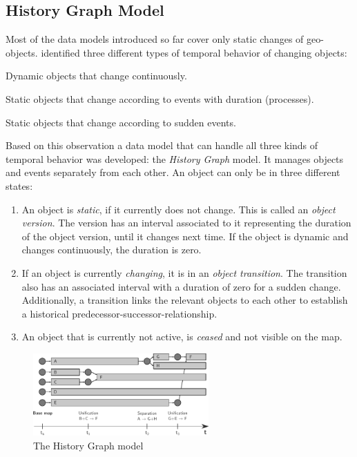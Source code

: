 
\subsection{History Graph Model} %
\label{sub:history_graph_model}

Most of the data models introduced so far cover only static changes of geo-objects. \cite{renolen96} identified three different types of temporal behavior of changing objects:
\begin{compactitem}
  \item Dynamic objects that change continuously.
  \item Static objects that change according to events with duration (processes).
  \item Static objects that change according to sudden events.
\end{compactitem}

Based on this observation a data model that can handle all three kinds of temporal behavior was developed: the \emph{History Graph} model. It manages objects and events separately from each other. An object can only be in three different states:
\begin{enumerate}
  \item An object is \emph{static}, if it currently does not change. This is called an \emph{object version}. The version has an interval associated to it representing the duration of the object version, until it changes next time. If the object is dynamic and changes continuously, the duration is zero.
  \item If an object is currently \emph{changing}, it is in an \emph{object transition}. The transition also has an associated interval with a duration of zero for a sudden change. Additionally, a transition links the relevant objects to each other to establish a historical predecessor-successor-relationship.
  \item An object that is currently not active, is \emph{ceased} and not visible on the map.
\end{enumerate}

\begin{figure}[H]
  \centering
  \includegraphics[width=0.60\textwidth]{graphics/basics/stdm/history_graph_model}
  \caption{The History Graph model}
  \label{fig:history_graph_model}
\end{figure}

